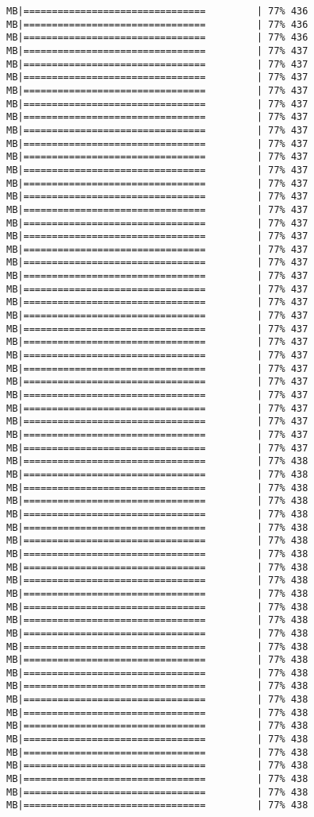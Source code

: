 \documentclass[
]{article}
\begin{document}
\begin{verbatim}
MB|================================         | 77% 436 MB|================================         | 77% 436 MB|================================         | 77% 436 MB|================================         | 77% 437 MB|================================         | 77% 437 MB|================================         | 77% 437 MB|================================         | 77% 437 MB|================================         | 77% 437 MB|================================         | 77% 437 MB|================================         | 77% 437 MB|================================         | 77% 437 MB|================================         | 77% 437 MB|================================         | 77% 437 MB|================================         | 77% 437 MB|================================         | 77% 437 MB|================================         | 77% 437 MB|================================         | 77% 437 MB|================================         | 77% 437 MB|================================         | 77% 437 MB|================================         | 77% 437 MB|================================         | 77% 437 MB|================================         | 77% 437 MB|================================         | 77% 437 MB|================================         | 77% 437 MB|================================         | 77% 437 MB|================================         | 77% 437 MB|================================         | 77% 437 MB|================================         | 77% 437 MB|================================         | 77% 437 MB|================================         | 77% 437 MB|================================         | 77% 437 MB|================================         | 77% 437 MB|================================         | 77% 437 MB|================================         | 77% 437 MB|================================         | 77% 438 MB|================================         | 77% 438 MB|================================         | 77% 438 MB|================================         | 77% 438 MB|================================         | 77% 438 MB|================================         | 77% 438 MB|================================         | 77% 438 MB|================================         | 77% 438 MB|================================         | 77% 438 MB|================================         | 77% 438 MB|================================         | 77% 438 MB|================================         | 77% 438 MB|================================         | 77% 438 MB|================================         | 77% 438 MB|================================         | 77% 438 MB|================================         | 77% 438 MB|================================         | 77% 438 MB|================================         | 77% 438 MB|================================         | 77% 438 MB|================================         | 77% 438 MB|================================         | 77% 438 MB|================================         | 77% 438 MB|================================         | 77% 438 MB|================================         | 77% 438 MB|================================         | 77% 438 MB|================================         | 77% 438 MB|================================         | 77% 438 
\end{verbatim}
\end{document}
